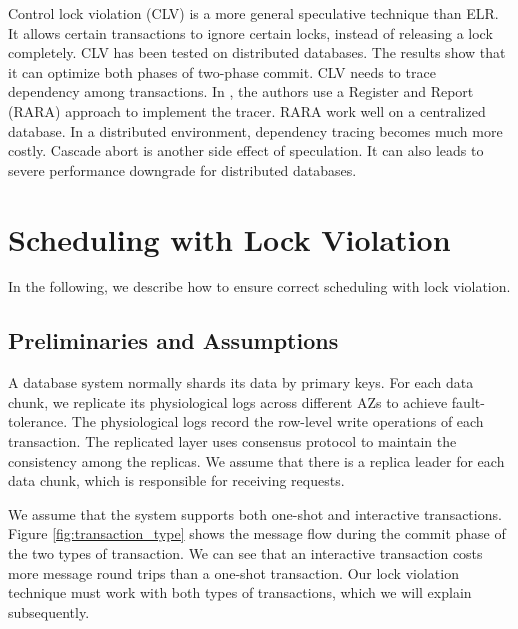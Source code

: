 \documentclass[conference]{IEEEtran}
\begin{document}
Control lock violation (CLV) \cite{CLV:conf/sigmod/GraefeLKTV13} is a more general speculative technique than ELR.
It allows certain transactions to ignore certain locks, instead of releasing a lock completely.
CLV has been tested on distributed databases. The results show that it can optimize both phases of two-phase commit.
CLV needs to trace dependency among transactions.
In \cite{CLV:conf/sigmod/GraefeLKTV13}, the authors use a Register and Report (RARA) approach \cite{HeckatonMVCC:journals/pvldb/LarsonBDFPZ11} to implement the tracer.
RARA work well on a centralized database. In a distributed environment, dependency tracing becomes much more costly.
Cascade abort is another side effect of speculation. It can also leads to severe performance downgrade for distributed databases.


\section{Scheduling with Lock Violation}
\label{sec:non_strict}

In the following, we describe how to ensure correct scheduling with lock violation.

\subsection{Preliminaries and Assumptions}
A database system normally shards its data by primary keys.
For each data chunk, we replicate its physiological logs across different AZs to achieve fault-tolerance.
The physiological logs record the row-level write operations of each transaction.
The replicated layer uses consensus protocol to maintain the consistency among the replicas.
We assume that there is a replica leader for each data chunk, which is responsible for receiving requests.

We assume that the system supports both one-shot and interactive transactions.
Figure \ref{fig:transaction_type} shows the message flow during the commit phase of the two types of transaction.
We can see that an interactive transaction costs more message round trips than a one-shot transaction.
Our lock violation technique must work with both types of transactions, which we will explain subsequently.
\end{document}
